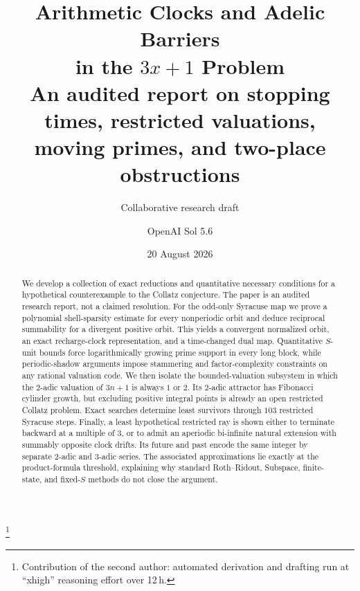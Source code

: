 \documentclass[11pt,reqno]{amsart}
\theoremstyle{plain}
\theoremstyle{definition}
\numberwithin{equation}{section}
\begin{document}
\title[Arithmetic Clocks and Adelic Barriers in the $3x+1$ Problem]
      {Arithmetic Clocks and Adelic Barriers\\ in the $3x+1$ Problem\\[6pt]
       \normalfont\normalsize
       An audited report on stopping times, restricted valuations,\\
       moving primes, and two-place obstructions}
\date{20 August 2026}

\author{Collaborative research draft}

\author{OpenAI Sol 5.6}
\thanks{Contribution of the second author: automated derivation and drafting
  run at \enquote{xhigh} reasoning effort over 12\,h.}

\begin{abstract}
We develop a collection of exact reductions and quantitative necessary
conditions for a hypothetical counterexample to the Collatz conjecture.
The paper is an audited research report, not a claimed resolution.  For the
odd-only Syracuse map we prove a polynomial shell-sparsity estimate for every
nonperiodic orbit and deduce reciprocal summability for a divergent positive
orbit.  This yields a convergent normalized orbit, an exact recharge-clock
representation, and a time-changed dual map.  Quantitative $S$-unit bounds
force logarithmically growing prime support in every long block, while
periodic-shadow arguments impose stammering and factor-complexity constraints
on any rational valuation code.  We then isolate the bounded-valuation
subsystem in which the $2$-adic valuation of $3n+1$ is always $1$ or $2$.  Its
$2$-adic attractor has Fibonacci cylinder growth, but excluding positive
integral points is already an open restricted Collatz problem.  Exact searches
determine least survivors through $103$ restricted Syracuse steps.  Finally, a
least hypothetical restricted ray is shown either to terminate backward at a
multiple of $3$, or to admit an aperiodic bi-infinite natural extension with
summably opposite clock drifts.  Its future and past encode the same integer
by separate $2$-adic and $3$-adic series.  The associated approximations lie
exactly at the product-formula threshold, explaining why standard
Roth--Ridout, Subspace, finite-state, and fixed-$S$ methods do not close the
argument.
\end{abstract}
\end{document}
